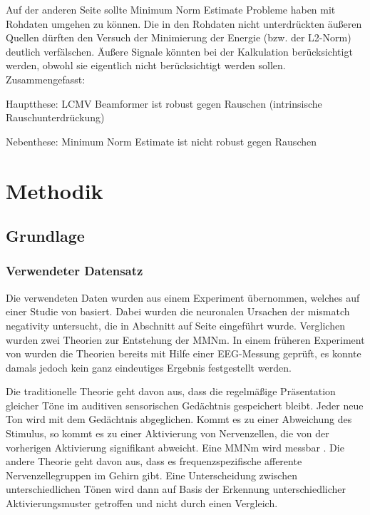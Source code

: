 \documentclass[doc,a4paper,12pt]{apa6}
\makeatletter
\DeclareRobustCommand*{\nameref}[1]{%
      \glqq{\myorg@nameref{#1}}\grqq%
    }%
\makeatother
\begin{document}
Auf der anderen Seite sollte Minimum Norm Estimate Probleme haben mit Rohdaten umgehen zu können. Die in den Rohdaten nicht unterdrückten äußeren Quellen dürften den Versuch der Minimierung der Energie (bzw. der L2-Norm) deutlich verfälschen. Äußere Signale könnten bei der Kalkulation berücksichtigt werden, obwohl sie eigentlich nicht berücksichtigt werden sollen. Zusammengefasst:

\begin{compactitem}
\item Hauptthese: LCMV Beamformer ist robust gegen Rauschen (intrinsische Rauschunterdrückung)
\item Nebenthese: Minimum Norm Estimate ist nicht robust gegen Rauschen
\end{compactitem}


\newpage

\section{Methodik}
\label{sec:methodik}

\subsection{Grundlage}

\subsubsection{Verwendeter Datensatz}

Die verwendeten Daten wurden aus einem Experiment übernommen, welches auf einer Studie von \textcite{maess2007localizing} basiert. Dabei wurden die neuronalen Ursachen der mismatch negativity untersucht, die in Abschnitt \nameref{sec:erf} auf Seite \pageref{sec:erf} eingeführt wurde. Verglichen wurden zwei Theorien zur Entstehung der MMNm. In einem früheren Experiment von \textcite{jacobsen2001there} wurden die Theorien bereits mit Hilfe einer EEG-Messung geprüft, es konnte damals jedoch kein ganz eindeutiges Ergebnis festgestellt werden.

Die traditionelle Theorie geht davon aus, dass die regelmäßige Präsentation gleicher Töne im auditiven sensorischen Gedächtnis gespeichert bleibt. Jeder neue Ton wird mit dem Gedächtnis abgeglichen. Kommt es zu einer Abweichung des Stimulus, so kommt es zu einer Aktivierung von Nervenzellen, die von der vorherigen Aktivierung signifikant abweicht. Eine MMNm wird messbar \parencite{naatanen2001primitive}. Die andere Theorie geht davon aus, dass es frequenzspezifische afferente Nervenzellegruppen im Gehirn gibt. Eine Unterscheidung zwischen unterschiedlichen Tönen wird dann auf Basis der Erkennung unterschiedlicher Aktivierungsmuster getroffen und nicht durch einen Vergleich.
\end{document}
